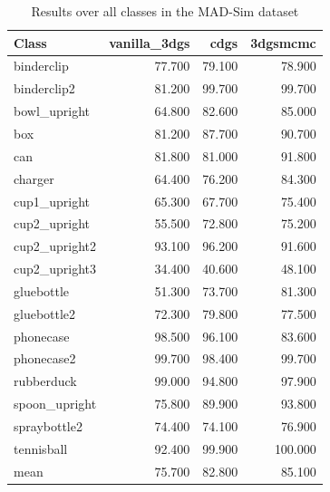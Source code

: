 \begin{table}[!htbp]
\centering
\scriptsize
\setlength{\tabcolsep}{4pt}
\renewcommand{\arraystretch}{0.95}
\begin{tabular}{l r r r}
\toprule
\textbf{Class} & \textbf{vanilla\_3dgs} & \textbf{cdgs} & \textbf{3dgsmcmc} \\
\midrule
binderclip & 77.700 & 79.100 & 78.900 \\
binderclip2 & 81.200 & 99.700 & 99.700 \\
bowl\_upright & 64.800 & 82.600 & 85.000 \\
box & 81.200 & 87.700 & 90.700 \\
can & 81.800 & 81.000 & 91.800 \\
charger & 64.400 & 76.200 & 84.300 \\
cup1\_upright & 65.300 & 67.700 & 75.400 \\
cup2\_upright & 55.500 & 72.800 & 75.200 \\
cup2\_upright2 & 93.100 & 96.200 & 91.600 \\
cup2\_upright3 & 34.400 & 40.600 & 48.100 \\
gluebottle & 51.300 & 73.700 & 81.300 \\
gluebottle2 & 72.300 & 79.800 & 77.500 \\
phonecase & 98.500 & 96.100 & 83.600 \\
phonecase2 & 99.700 & 98.400 & 99.700 \\
rubberduck & 99.000 & 94.800 & 97.900 \\
spoon\_upright & 75.800 & 89.900 & 93.800 \\
spraybottle2 & 74.400 & 74.100 & 76.900 \\
tennisball & 92.400 & 99.900 & 100.000 \\
\midrule
mean & 75.700 & 82.800 & 85.100 \\
\bottomrule
\end{tabular}
\caption{Results over all classes in the MAD-Sim dataset}
\label{tab:results\_mad}
\end{table}